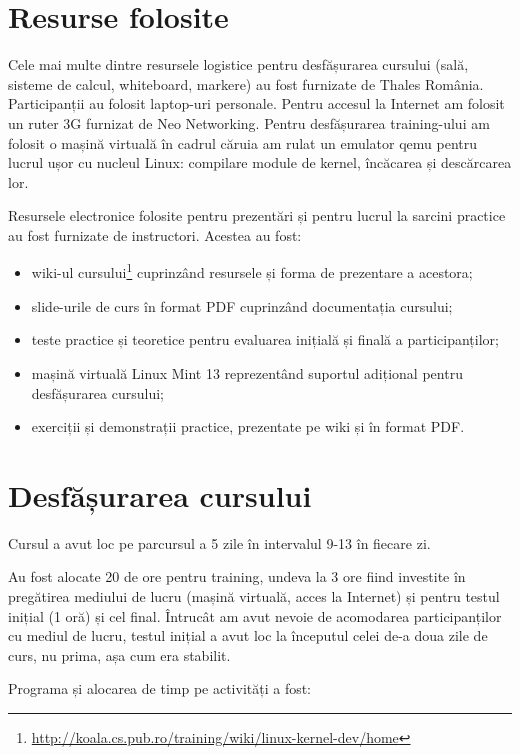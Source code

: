 \documentclass[12pt]{article}
\begin{document}
\section{Resurse folosite}

Cele mai multe dintre resursele logistice pentru desfășurarea cursului (sală, sisteme de calcul, whiteboard, markere) au fost furnizate de Thales România. Participanții au folosit laptop-uri personale. Pentru accesul la Internet am folosit un ruter 3G furnizat de Neo Networking. Pentru desfășurarea training-ului am folosit o mașină virtuală în cadrul căruia am rulat un emulator qemu pentru lucrul ușor cu nucleul Linux: compilare module de kernel, încăcarea și descărcarea lor.

Resursele electronice folosite pentru prezentări și pentru lucrul la sarcini
practice au fost furnizate de instructori. Acestea au fost:
\begin{itemize}
  \item wiki-ul cursului\footnote{\url{http://koala.cs.pub.ro/training/wiki/linux-kernel-dev/home}} cuprinzând resursele și forma de prezentare a acestora;
  \item slide-urile de curs în format PDF cuprinzând documentația cursului;
  \item teste practice și teoretice pentru evaluarea inițială și finală a participanților;
  \item mașină virtuală Linux Mint 13 reprezentând suportul adițional pentru desfășurarea cursului;
  \item exerciții și demonstrații practice, prezentate pe wiki și în format PDF.
\end{itemize}

\section{Desfășurarea cursului}

Cursul a avut loc pe parcursul a 5 zile în intervalul 9-13 în fiecare zi.

Au fost alocate 20 de ore pentru training, undeva la 3 ore fiind investite în pregătirea mediului de lucru (mașină virtuală, acces la Internet) și pentru testul inițial (1 oră) și cel final. Întrucât am avut nevoie de acomodarea participanților cu mediul de lucru, testul inițial a avut loc la începutul celei de-a doua zile de curs, nu prima, așa cum era stabilit.

Programa și alocarea de timp pe activități a fost:
\end{document}
